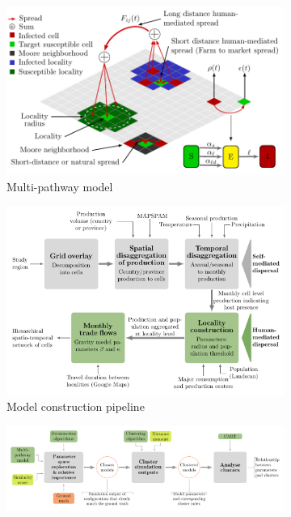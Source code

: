 \documentclass[11pt]{article}
\theoremstyle{definition}
\begin{document}
\begin{figure}[t]
\centering
\begin{subfigure}[b]{.4\textwidth}
    \includegraphics[width=1.1\textwidth]{figs/model_schematic.pdf}
\caption{Multi-pathway model\label{fig:concept}}
\end{subfigure}
\begin{subfigure}[b]{.56\textwidth}
    \includegraphics[width=1.05\textwidth]{figs/pipeline.pdf}
\caption{Model construction pipeline\label{fig:pipeline}}
\end{subfigure}
\begin{subfigure}[b]{.8\textwidth}
    \centering
    \includegraphics[width=\textwidth]{figs/spread_analysis.pdf}

\end{subfigure}
\end{figure}
\end{document}
